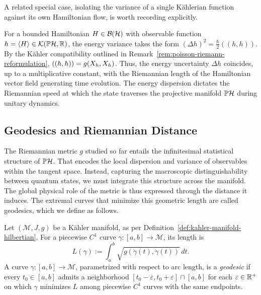 \noindent A related special case, isolating the variance of a single Kählerian function against its own Hamiltonian flow, is worth recording explicitly.

\begin{example}
	For a bounded Hamiltonian $H \in \BH$ with observable function $h=\langle H\rangle \in \mathcal{K}(\PH, \R)$, the energy variance takes the form $(\Delta h)^2 = \frac{\hbar}{2}((h,h))$. By the Kähler compatibility outlined in Remark~\ref{rem:poisson-riemann-reformulation}, $((h,h)) = g(X_{h},X_{h})$. Thus, the energy uncertainty $\Delta h$ coincides, up to a multiplicative constant, with the Riemannian length of the Hamiltonian vector field generating time evolution. The energy dispersion dictates the Riemannian speed at which the state traverses the projective manifold $\PH$ during unitary dynamics.
\end{example}

\subsection*{Geodesics and Riemannian Distance}\label{sec:distinguish}

\noindent The Riemannian metric $g$ studied so far entails the infinitesimal statistical structure of $\PH$. That encodes the local dispersion and variance of observables within the tangent space. Instead, capturing the macroscopic distinguishability between quantum states, we must integrate this structure across the manifold. The global physical role of the metric is thus expressed through the distance it induces. The extremal curves that minimize this geometric length are called geodesics, which we define as follows.

\begin{definition}[Geodesic]
	\label{def:geodesic}
	Let $(\mathcal{M},J,g)$ be a Kähler manifold, as per Definition~\ref{def:kahler-manifold-hilbertian}. For a piecewise $C^1$ curve $\gamma:[a,b]\to\mathcal{M}$, its length is
	\begin{equation}
		L(\gamma):=\int_a^b\sqrt{g(\dot\gamma(t),\dot\gamma(t))}\,dt.
	\end{equation}
	A curve $\gamma:[a,b]\to\mathcal{M}$, parametrized with respect to arc
	length, is a \emph{geodesic} if every $t_0\in[a,b]$ admits a neighborhood
	$[t_0-\varepsilon,t_0+\varepsilon]\cap[a,b]$ for each $\varepsilon \in \mathbb{R}^+$ on which $\gamma$ minimizes
	$L$ among piecewise $C^1$ curves with the same endpoints.
\end{definition}

